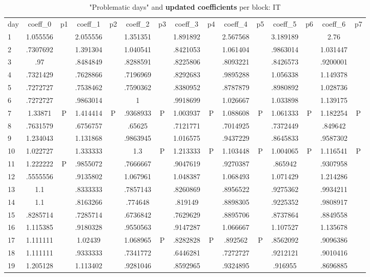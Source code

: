 \documentclass[a4paper,12pt]{article}
\begin{document}
\begin{landscape}
\begin{footnotesize}
\begin{center}
\begin{longtable}{l|cc|cc|cc|cc|cc|cc|cc|}
\caption{"Problematic days" and \textbf{updated coefficients} per block: IT\label{tab_it_5}}
\hline
day&coeff\_0&p1&coeff\_1&p2&coeff\_2&p3&coeff\_3&p4&coeff\_4&p5&coeff\_5&p6&coeff\_6&p7 \\
1&1.055556&&2.055556&&1.351351&&1.891892&&2.567568&&3.189189&&2.76& \\
2&.7307692&&1.391304&&1.040541&&.8421053&&1.061404&&.9863014&&1.031447& \\
3&.97&&.8484849&&.8288591&&.8225806&&.8093221&&.8426573&&.9200001& \\
4&.7321429&&.7628866&&.7196969&&.8292683&&.9895288&&1.056338&&1.149378& \\
5&.7272727&&.7538462&&.7590362&&.8380952&&.8787879&&.8980892&&1.028736& \\
6&.7272727&&.9863014&&1&&.9918699&&1.026667&&1.033898&&1.139175& \\
7&1.33871&P&1.414414&P&.9368933&P&1.003937&P&1.088608&P&1.061333&P&1.182254&P \\
8&.7631579&&.6756757&&.65625&&.7121771&&.7014925&&.7372449&&.849642& \\
9&1.234043&&1.131868&&.9863945&&1.016575&&.9437229&&.8645833&&.9587302& \\
10&1.022727&&1.333333&&1.3&P&1.213333&P&1.103448&P&1.004065&P&1.116541&P \\
11&1.222222&P&.9855072&&.7666667&&.9047619&&.9270387&&.865942&&.9307958& \\
12&.5555556&&.9135802&&1.067961&&1.048387&&1.068493&&1.071429&&1.214286& \\
13&1.1&&.8333333&&.7857143&&.8260869&&.8956522&&.9275362&&.9934211& \\
14&1.1&&.8163266&&.774648&&.819149&&.8898305&&.9225352&&.9808917& \\
15&.8285714&&.7285714&&.6736842&&.7629629&&.8895706&&.8737864&&.8849558& \\
16&1.115385&&.9180328&&.9550563&&.9147287&&1.066667&&1.107527&&1.135678& \\
17&1.111111&&1.02439&&1.068965&P&.8282828&P&.892562&P&.8562092&&.9096386& \\
18&1.111111&&.9333333&&.7341772&&.6446281&&.7272727&&.9212121&&.9010416& \\
19&1.205128&&1.113402&&.9281046&&.8592965&&.9324895&&.916955&&.8696885& \\

\end{longtable}
\end{center}
\end{footnotesize}
\end{landscape}
\end{document}
